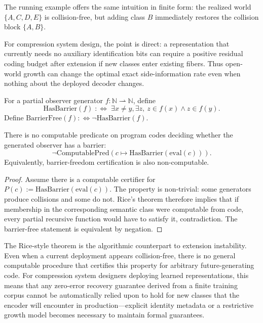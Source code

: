 The running example offers the same intuition in finite form: the realized world $\{A,C,D,E\}$ is collision-free, but adding class $B$ immediately restores the collision block $\{A,B\}$.

For compression system design, the point is direct: a representation that currently needs no auxiliary identification bits can require a positive residual coding budget after extension if new classes enter existing fibers. Thus open-world growth can change the optimal exact side-information rate even when nothing about the deployed decoder changes.

\begin{definition}
For a partial observer generator $f:\mathbb{N}\rightharpoonup\mathbb{N}$, define
\[
\mathrm{HasBarrier}(f)\;:\Leftrightarrow\;\exists x\neq y,\exists z,\ z\in f(x)\land z\in f(y).
\]
Define $\mathrm{BarrierFree}(f):\Leftrightarrow \neg\mathrm{HasBarrier}(f)$.
\end{definition}

\begin{theorem}\label{thm:rice-barrier}
There is no computable predicate on program codes deciding whether the generated observer has a barrier:
\[
\neg\mathrm{ComputablePred}\!\left(c\mapsto \mathrm{HasBarrier}(\mathrm{eval}(c))\right).
\]
Equivalently, barrier-freedom certification is also non-computable.
\end{theorem}

\begin{proof}
Assume there is a computable certifier for $P(c):=\mathrm{HasBarrier}(\mathrm{eval}(c))$. The property is non-trivial: some generators produce collisions and some do not. Rice's theorem therefore implies that if membership in the corresponding semantic class were computable from code, every partial recursive function would have to satisfy it, contradiction. The barrier-free statement is equivalent by negation.
\end{proof}

\begin{remark}
The Rice-style theorem is the algorithmic counterpart to extension instability. Even when a current deployment appears collision-free, there is no general computable procedure that certifies this property for arbitrary future-generating code. For compression system designers deploying learned representations, this means that any zero-error recovery guarantee derived from a finite training corpus cannot be automatically relied upon to hold for new classes that the encoder will encounter in production—explicit identity metadata or a restrictive growth model becomes necessary to maintain formal guarantees.
\end{remark}

